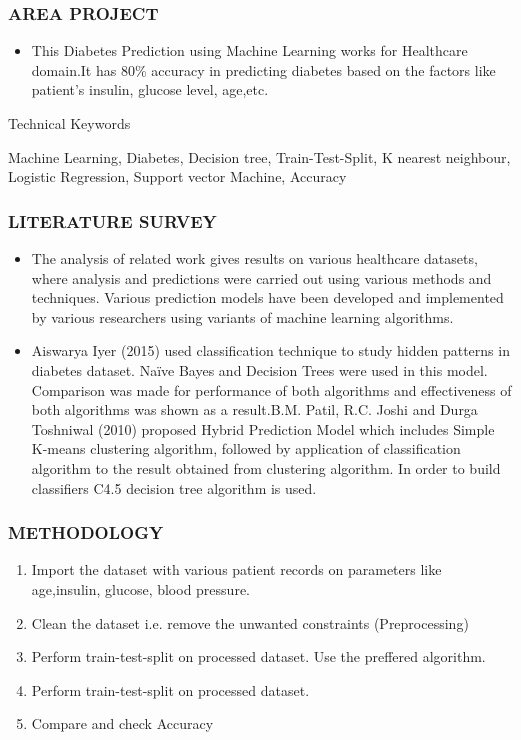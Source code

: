 \documentclass{beamer}
\begin{document}
\begin{frame}
\frametitle{\bf AREA PROJECT}
  \begin{itemize}
      \item \normalsize{This Diabetes Prediction using Machine Learning works for Healthcare domain.It has 80\% accuracy in predicting diabetes based on the factors like patient’s insulin, glucose level, age,etc.}
  \end{itemize}
\begin{block}
    {}
    Technical Keywords
  \end{block}
  \normalsize{Machine Learning, Diabetes, Decision tree, Train-Test-Split, K nearest neighbour, Logistic Regression, Support vector Machine, Accuracy
}  
  \end{frame}
  
 \begin{frame}
\frametitle{\bf LITERATURE SURVEY}
  \begin{itemize}
      
      \item \normalsize{The analysis of related work gives results on various healthcare datasets, where analysis and predictions were carried out using various methods and techniques. Various prediction models have been developed and implemented by various researchers using variants of machine learning algorithms.}
     
      \item \normalsize{Aiswarya Iyer (2015) used classification technique to study hidden patterns in diabetes dataset. Naïve Bayes and Decision Trees were used in this model. Comparison was made for performance of both algorithms and effectiveness of both algorithms was shown as a result.B.M. Patil, R.C. Joshi and Durga Toshniwal (2010) proposed Hybrid Prediction Model which includes Simple K-means clustering algorithm, followed by application of classification algorithm to the result obtained from clustering algorithm. In order to build classifiers C4.5 decision tree algorithm is used.}
  \end{itemize}
  \end{frame}

\begin{frame}
\frametitle{\bf METHODOLOGY}
  \begin{enumerate}
      \item Import the dataset with various patient records on parameters like age,insulin, glucose, blood pressure.
      \item Clean the dataset i.e. remove the unwanted constraints (Preprocessing)
      \item Perform train-test-split on processed dataset. Use the preffered algorithm.
      \item Perform train-test-split on processed dataset.
      \item Compare and check Accuracy

  \end{enumerate}
\end{frame}
\end{document}
